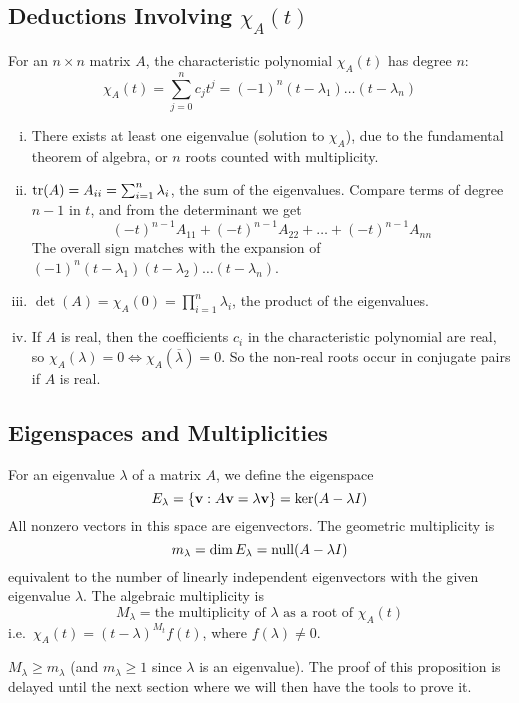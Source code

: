 \subsection{Deductions Involving \(\chi_A(t)\)}
For an \(n \times n\) matrix \(A\), the characteristic polynomial \(\chi_A(t)\) has degree \(n\):
\[
	\chi_A(t) = \sum_{j = 0}^n c_j t^j = (-1)^n(t-\lambda_1)\dots(t-\lambda_n)
\]
\begin{enumerate}[(i)]
	\item There exists at least one eigenvalue (solution to \(\chi_A\)), due to the fundamental theorem of algebra, or \(n\) roots counted with multiplicity.
	\item \(\tr(A) = A_{ii} = \sum_{i=1}^n \lambda_i\), the sum of the eigenvalues.
	      Compare terms of degree \(n-1\) in \(t\), and from the determinant we get
	      \[
		      (-t)^{n-1}A_{11} + (-t)^{n-1}A_{22} + \dots + (-t)^{n-1}A_{nn}
	      \]
	      The overall sign matches with the expansion of \((-1)^n(t-\lambda_1)(t-\lambda_2)\dots(t-\lambda_n)\).
	\item \(\det(A) = \chi_A(0) = \prod_{i=1}^n \lambda_i\), the product of the eigenvalues.
	\item If \(A\) is real, then the coefficients \(c_i\) in the characteristic polynomial are real, so \(\chi_A(\lambda) = 0 \iff \chi_A(\overline\lambda) = 0\).
	      So the non-real roots occur in conjugate pairs if \(A\) is real.
\end{enumerate}

\subsection{Eigenspaces and Multiplicities}
For an eigenvalue \(\lambda\) of a matrix \(A\), we define the eigenspace
\[
	E_\lambda = \{ \vb v : A \vb v = \lambda \vb v \} = \ker (A - \lambda I)
\]
All nonzero vectors in this space are eigenvectors.
The geometric multiplicity is
\[
	m_\lambda = \dim E_\lambda = \operatorname{null} (A - \lambda I)
\]
equivalent to the number of linearly independent eigenvectors with the given eigenvalue \(\lambda\).
The algebraic multiplicity is
\[
	M_\lambda = \text{the multiplicity of } \lambda \text{ as a root of } \chi_A(t)
\]
i.e.\ \(\chi_A(t) = (t - \lambda)^{M_t} f(t)\), where \(f(\lambda) \neq 0\).

\begin{proposition}
	\(M_\lambda \geq m_\lambda\) (and \(m_\lambda \geq 1\) since \(\lambda\) is an eigenvalue).
	The proof of this proposition is delayed until the next section where we will then have the tools to prove it.
\end{proposition}

